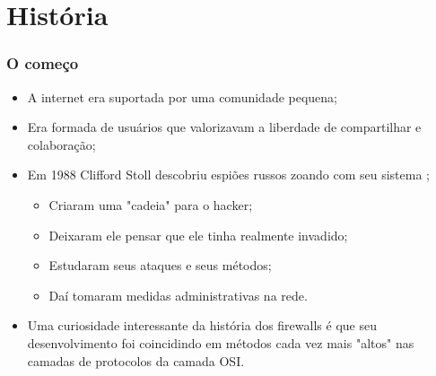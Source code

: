 \section{História}

\begin{frame}
	\frametitle{O começo \cite{history}} 

	\begin{itemize}
		\item A internet era suportada por uma comunidade pequena;
		\item Era formada de usuários que valorizavam a liberdade de compartilhar e colaboração;
		\item Em 1988 Clifford Stoll descobriu espiões russos zoando com seu sistema \cite{stoll};
		\begin{itemize}
			\item{Criaram uma "cadeia" para o hacker;}
			\item{Deixaram ele pensar que ele tinha realmente invadido;}
			\item{Estudaram seus ataques e seus métodos;}
			\item{Daí tomaram medidas administrativas na rede.}
		\end{itemize}
		\item Uma curiosidade interessante da história dos firewalls é que seu desenvolvimento foi coincidindo em métodos cada vez mais "altos" nas camadas de protocolos da camada OSI.
	\end{itemize}
\end{frame}
